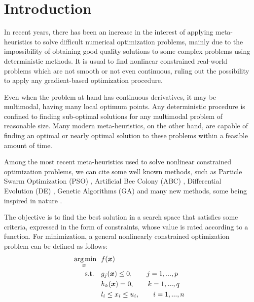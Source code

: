 \section{Introduction} \label{sec:Introduction}

In recent years, there has been an increase in the interest of applying meta-heuristics to solve difficult numerical optimization problems, mainly due to the impossibility of obtaining good quality solutions to some complex problems using deterministic methods. It is usual to find nonlinear constrained real-world problems which are not smooth or not even continuous, ruling out the possibility to apply any gradient-based optimization procedure.

Even when the problem at hand has continuous derivatives, it may be multimodal, having many local optimum points. Any deterministic procedure is confined to finding sub-optimal solutions for any multimodal problem of reasonable size. Many modern meta-heuristics, on the other hand, are capable of finding an optimal or nearly optimal solution to these problems within a feasible amount of time.

Among the most recent meta-heuristics used to solve nonlinear constrained optimization problems, we can cite some well known methods, such as Particle Swarm Optimization (PSO) \citep{IPSO, IAPSO, PSO1}, Artificial Bee Colony (ABC) \citep{CB-ABC, IABC-Mal}, Differential Evolution (DE) \citep{DE1, DE2, MVDE}, Genetic Algorithms (GA) \citep{GA1} and many new methods, some being inspired in nature \citep{CS, WCA, MBA}.

The objective is to find the best solution in a search space that satisfies some criteria, expressed in the form of constraints, whose value is rated according to a function. For minimization, a general nonlinearly constrained optimization problem can be defined as follows: \\[-3em]

\begin{equation}\label{eq:func}
    \begin{aligned}
    \underset{\bm{x}}{\text{\fnt{10} arg\,min}} \ \ & f(\bm{x}) \\
    \text{s.t.} \quad & g_j(\bm{x}) \leq 0, \qquad j = 1, ..., p  \\
                      & h_k(\bm{x}) = 0, \qquad k = 1, ..., q  \\
                      & l_i \leq x_i \leq u_i, \qquad i = 1, ..., n 
    \end{aligned}
\end{equation}

